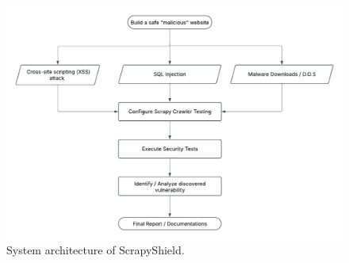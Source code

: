 \begin{figure}[!t]
  \centering
  \includegraphics[width=\textwidth]{figures/blockarch.png}
  \caption{System architecture of ScrapyShield.}
  \label{fig:architecture}
\end{figure}
